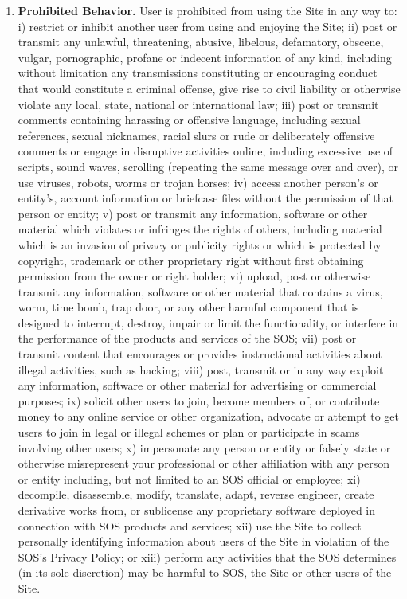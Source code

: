 \begin{enumerate}
    \item \textbf{Prohibited Behavior.} User is prohibited from using the Site
    in any way to:
    i) restrict or inhibit another user from using and enjoying the Site;
    ii) post or transmit any unlawful, threatening, abusive, libelous,
    defamatory, obscene, vulgar, pornographic, profane or indecent information
    of any kind, including without limitation any transmissions constituting or
    encouraging conduct that would constitute a criminal offense, give rise to
    civil liability or otherwise violate any local, state, national or
    international law;
    iii) post or transmit comments containing harassing or offensive language,
    including sexual references, sexual nicknames, racial slurs or rude or
    deliberately offensive comments or engage in disruptive activities online,
    including excessive use of scripts, sound waves, scrolling (repeating the
    same message over and over), or use viruses, robots, worms or trojan horses;
    iv) access another person's or entity's, account information or briefcase
    files without the permission of that person or entity;
    v) post or transmit any information, software or other material which
    violates or infringes the rights of others, including material which is an
    invasion of privacy or publicity rights or which is protected by copyright,
    trademark or other proprietary right without first obtaining permission from
    the owner or right holder;
    vi) upload, post or otherwise transmit any information, software or other
    material that contains a virus, worm, time bomb, trap door, or any other
    harmful component that is designed to interrupt, destroy, impair or limit
    the functionality, or interfere in the performance of the products and
    services of the SOS;
    vii) post or transmit content that encourages or provides instructional
    activities about illegal activities, such as hacking;
    viii) post, transmit or in any way exploit any information, software or
    other material for advertising or commercial purposes;
    ix) solicit other users to join, become members of, or contribute money to
    any online service or other organization, advocate or attempt to get users
    to join in legal or illegal schemes or plan or participate in scams
    involving other users;
    x) impersonate any person or entity or falsely state or otherwise
    misrepresent your professional or other affiliation with any person or
    entity including, but not limited to an SOS official or employee;
    xi) decompile, disassemble, modify, translate, adapt, reverse engineer,
    create derivative works from, or sublicense any proprietary software
    deployed in connection with SOS products and services;
    xii) use the Site to collect personally identifying information about users
    of the Site in violation of the SOS's Privacy Policy; or xiii) perform any
    activities that the SOS determines (in its sole discretion) may be harmful
    to SOS, the Site or other users of the Site.
    

\end{enumerate}
